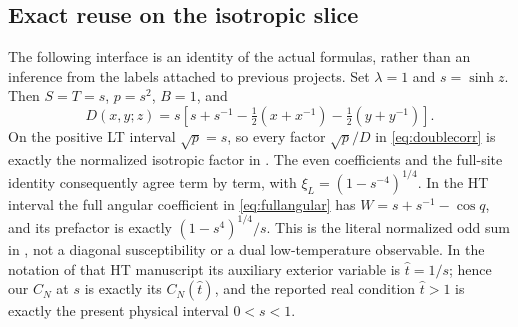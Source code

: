 \documentclass[11pt]{article}
\numberwithin{equation}{section}
\theoremstyle{definition}
\begin{document}
\subsection{Exact reuse on the isotropic slice}
The following interface is an identity of the actual formulas, rather
than an inference from the labels attached to previous projects. Set
$\lambda=1$ and $s=\sinh z$. Then $S=T=s$, $p=s^2$, $B=1$, and
\[
 D(x,y;z)=s\left[s+s^{-1}
                  -\tfrac12(x+x^{-1})-\tfrac12(y+y^{-1})\right].
\]
On the positive LT interval $\sqrt p=s$, so every factor
$\sqrt p/D$ in \eqref{eq:doublecorr} is exactly the normalized
isotropic factor in \cite{LTsource}. The even coefficients and the
full-site identity consequently agree term by term, with
$\xi_L=(1-s^{-4})^{1/4}$. In the HT interval the full angular coefficient
in \eqref{eq:fullangular} has $W=s+s^{-1}-\cos q$, and its prefactor
is exactly $(1-s^4)^{1/4}/s$. This is the literal normalized odd sum
in \cite{HTsource,HTreport}, not a diagonal susceptibility or a dual
low-temperature observable.
In the notation of that HT manuscript its auxiliary exterior variable
is $\widehat t=1/s$; hence our $C_N$ at $s$ is exactly its
$C_N(\widehat t)$, and the reported real condition $\widehat t>1$
is exactly the present physical interval $0<s<1$.
\end{document}
